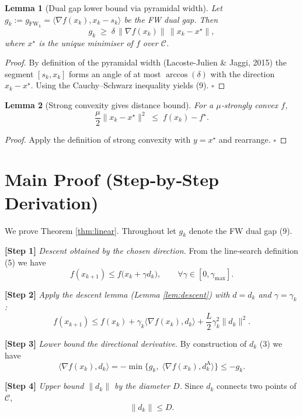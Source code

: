 \documentclass{article}
\newtheorem{lemma}{Lemma}
\newcommand{\gap}{g_{\text{FW}}}
\newcommand{\diam}{D}
\newcommand{\pwidth}{\delta}
\begin{document}
\begin{lemma}[Dual gap lower bound via pyramidal width]\label{lem:gap}
Let $g_k:=\gap_k=\langle\nabla f(x_k),x_k-s_k\rangle$ be the FW dual gap. Then
\[
g_k\;\ge\;\pwidth\,\|\nabla f(x_k)\|\,\|x_k-x^\star\|,
\tag{9}
\]
where $x^\star$ is the unique minimiser of $f$ over $\mathcal{C}$.
\end{lemma}
\begin{proof}
By definition of the pyramidal width (Lacoste-Julien \& Jaggi, 2015) the
segment $[s_k,x_k]$ forms an angle of at most $\arccos(\pwidth)$ with the
direction $x_k-x^\star$. Using the Cauchy–Schwarz inequality yields (9). \hfill $\square$
\end{proof}

\begin{lemma}[Strong convexity gives distance bound]\label{lem:strong}
For a $\mu$‑strongly convex $f$,
\[
\frac{\mu}{2}\|x_k-x^\star\|^{2}\;\le\; f(x_k)-f^\star .
\tag{10}
\]
\end{lemma}
\begin{proof}
Apply the definition of strong convexity with $y=x^\star$ and rearrange. \hfill $\square$
\end{proof}

\section*{Main Proof (Step‑by‑Step Derivation)}

We prove Theorem \ref{thm:linear}. Throughout let $g_k$ denote the FW dual gap (9).

\noindent\textbf{[Step 1]} \emph{Descent obtained by the chosen direction.}  
From the line‑search definition (5) we have
\[
f(x_{k+1})\le f\bigl(x_k+\gamma d_k\bigr),\qquad\forall\gamma\in[0,\gamma_{\max}].
\tag{11}
\]

\noindent\textbf{[Step 2]} \emph{Apply the descent lemma (Lemma \ref{lem:descent}) with $d=d_k$ and $\gamma=\gamma_k$:}
\[
f(x_{k+1})\le f(x_k)+\gamma_k\langle\nabla f(x_k),d_k\rangle
+\frac{L}{2}\gamma_k^{2}\|d_k\|^{2}.
\tag{12}
\]

\noindent\textbf{[Step 3]} \emph{Lower bound the directional derivative.}  
By construction of $d_k$ (3) we have
\[
\langle\nabla f(x_k),d_k\rangle = -\min\bigl\{g_k,\; \langle\nabla f(x_k),d_k^{\text{A}}\rangle\bigr\}
\le -g_k .
\tag{13}
\]

\noindent\textbf{[Step 4]} \emph{Upper bound $\|d_k\|$ by the diameter $\diam$.}
Since $d_k$ connects two points of $\mathcal{C}$,
\[
\|d_k\|\le \diam .
\tag{14}
\]
\end{document}
